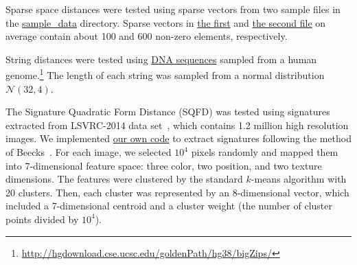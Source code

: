\documentclass[runningheads,a4paper]{llncs}
\newcommand{\replocfile}{https://github.com/searchivarius/nmslib/blob/v1.5/}
\begin{document}
{Sparse space distances were tested using sparse vectors from two sample files in the
\href{\replocfile sample_data}{sample\_data} directory.
Sparse vectors in 
\href{\replocfile sample_data/sparse_5K.txt}{the first} 
and
\href{\replocfile sample_data/sparse_wiki_5K.txt}{the second file} on average contain
about 100 and 600 non-zero elements, respectively.

String distances were tested using \href{\replocfile sample_data/dna32_4_5K.txt}{DNA sequences} sampled from a human genome.\footnote{\url{http://hgdownload.cse.ucsc.edu/goldenPath/hg38/bigZips/}}
The length of each string was sampled from a normal distribution $\mathcal{N}(32,4)$. 

The Signature Quadratic Form Distance (SQFD) \cite{Beecks:2010,Beecks:2013} was tested 
using signatures extracted from LSVRC-2014 data set~\cite{ILSVRCarxiv14}, 
which contains 1.2 million high resolution images.
We implemented \href{\replocfile data/data\_conv/sqfd}{our own code} to extract signatures following the method of Beecks~\cite{Beecks:2013}.
For each image, we selected $10^4$ pixels randomly and
mapped them into 7-dimensional feature space:
three color, two position, and two texture dimensions.
The features were clustered by the standard $k$-means algorithm with 20 clusters.
Then, each cluster was represented by an 8-dimensional vector, which included
a 7-dimensional centroid and a cluster weight (the number of cluster points divided
by $10^4$).

}
\end{document}
